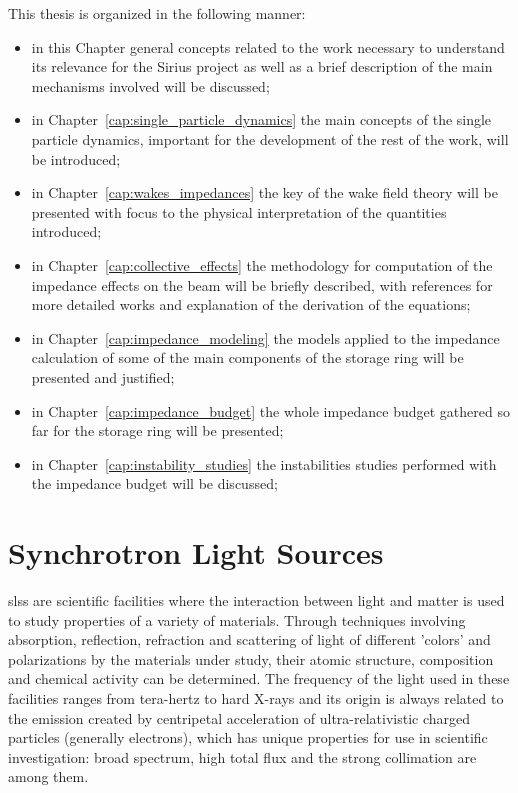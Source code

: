     This thesis is organized in the following manner:
    \begin{itemize}
        \item in this Chapter general concepts related to the work necessary to understand its relevance for the Sirius project as well as a brief description of the main mechanisms involved will be discussed;
        \item in Chapter~\ref{cap:single_particle_dynamics} the main concepts of the single particle dynamics, important for the development of the rest of the work, will be introduced;
        \item in Chapter~\ref{cap:wakes_impedances} the key of the wake field theory will be presented with focus to the physical interpretation of the quantities introduced;
        \item in Chapter~\ref{cap:collective_effects} the methodology for computation of the impedance effects on the beam will be briefly described, with references for more detailed works and explanation of the derivation of the equations;
        \item in Chapter~\ref{cap:impedance_modeling} the models applied to the impedance calculation of some of the main components of the storage ring will be presented and justified;
        \item in Chapter~\ref{cap:impedance_budget} the whole impedance budget gathered so far for the storage ring will be presented;
        \item in Chapter~\ref{cap:instability_studies} the instabilities studies performed with the impedance budget will be discussed;
    \end{itemize}

\section{Synchrotron Light Sources}

     \glspl{sls} are scientific facilities where the interaction between light and matter is used to study properties of a variety of materials. Through techniques involving absorption, reflection, refraction and scattering of light of different 'colors' and polarizations by the materials under study, their atomic structure, composition and chemical activity can be determined. The frequency of the light used in these facilities ranges from tera-hertz to hard X-rays and its origin is always related to the emission created by centripetal acceleration of ultra-relativistic charged particles (generally electrons), which has unique properties for use in scientific investigation: broad spectrum, high total flux and the strong collimation are among them.


